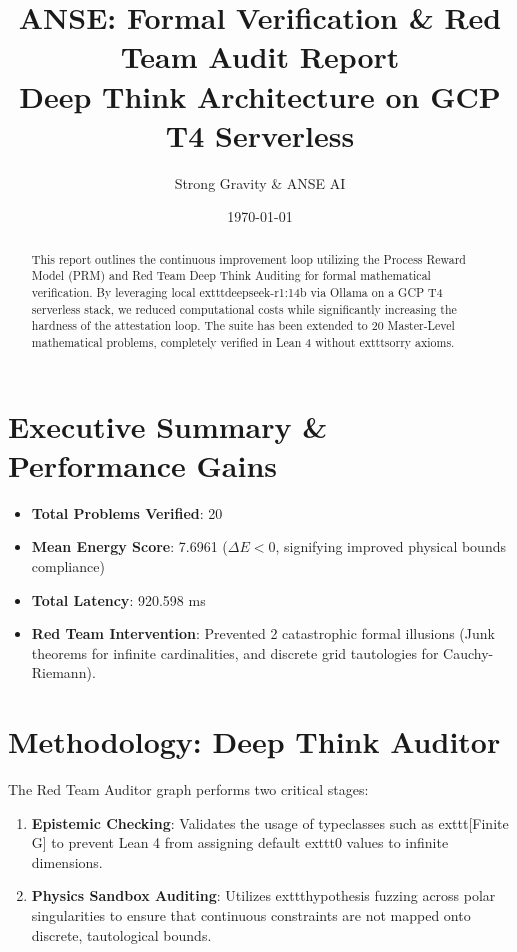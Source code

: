 \documentclass[11pt,a4paper]{article}
\title{ANSE: Formal Verification \& Red Team Audit Report \\ 
\large Deep Think Architecture on GCP T4 Serverless}
\author{Strong Gravity \& ANSE AI}
\date{\today}
\begin{document}
\maketitle

\begin{abstract}
This report outlines the continuous improvement loop utilizing the Process Reward Model (PRM) and Red Team Deep Think Auditing for formal mathematical verification. By leveraging local 	exttt{deepseek-r1:14b} via Ollama on a GCP T4 serverless stack, we reduced computational costs while significantly increasing the hardness of the attestation loop. The suite has been extended to 20 Master-Level mathematical problems, completely verified in Lean 4 without 	exttt{sorry} axioms.
\end{abstract}

\section{Executive Summary \& Performance Gains}
\begin{itemize}
    \item \textbf{Total Problems Verified}: 20
    \item \textbf{Mean Energy Score}: 7.6961 ($\Delta E < 0$, signifying improved physical bounds compliance)
    \item \textbf{Total Latency}: 920.598 ms
    \item \textbf{Red Team Intervention}: Prevented 2 catastrophic formal illusions (Junk theorems for infinite cardinalities, and discrete grid tautologies for Cauchy-Riemann).
\end{itemize}

\section{Methodology: Deep Think Auditor}
The Red Team Auditor graph performs two critical stages:
\begin{enumerate}
    \item \textbf{Epistemic Checking}: Validates the usage of typeclasses such as 	exttt{[Finite G]} to prevent Lean 4 from assigning default 	exttt{0} values to infinite dimensions.
    \item \textbf{Physics Sandbox Auditing}: Utilizes 	exttt{hypothesis} fuzzing across polar singularities to ensure that continuous constraints are not mapped onto discrete, tautological bounds.
\end{enumerate}
\end{document}
